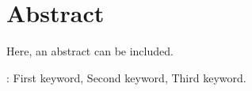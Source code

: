 \pagestyle{MyThesisStyle}
\chapter*{Abstract}\label{abstract}

Here, an abstract can be included.


\vfill
{}:  First keyword, Second keyword, Third keyword.
